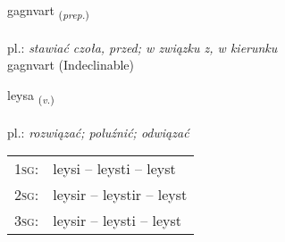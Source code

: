 \documentclass[frontgrid, backgrid]{flacards}\usepackage[]{graphicx}\usepackage[]{xcolor}
\begin{document}

\renewcommand{\flhead}{\vskip5pt \fboxsep=0pt {\small\bfseries\footnotesize Forsetning | przyimek}}
\renewcommand{\fcfoot}{\vskip5pt \fboxsep=0pt \hspace{2pt}{\small\bfseries\footnotesize 1K}}

\renewcommand{\blhead}{\vskip5pt {\small\bfseries\footnotesize Forsetning | przyimek }}
\renewcommand{\bcfoot}{\vskip5pt \hspace{2pt}{\small\bfseries\footnotesize 1K}}


{gagnvart \small{\textsubscript{(\textit{prep.})}} \\[1ex]
\textphonetic{[kakvar̥t]} \\
pl.: \emph{stawiać czoła, przed; w związku z, w kierunku} \\  [2ex]
gagnvart (Indeclinable)}

\renewcommand{\flhead}{\vskip5pt \fboxsep=0pt {\small\bfseries\footnotesize Sagnorð | czasownik}}
\renewcommand{\fcfoot}{\vskip5pt \fboxsep=0pt \hspace{2pt}{\small\bfseries\footnotesize 1K}}

\renewcommand{\blhead}{\vskip5pt {\small\bfseries\footnotesize Sagnorð | czasownik }}
\renewcommand{\bcfoot}{\vskip5pt \hspace{2pt}{\small\bfseries\footnotesize 1K}}


{leysa \small{\textsubscript{(\textit{v.})}} \\[1ex] %
\textphonetic{[leiːsa]} \\
pl.: \emph{rozwiązać; poluźnić; odwiązać} \\  [2ex]
\renewcommand*{\arraystretch}{0.8}
\begin{tabular}{p{1cm}l}
\textsc{1sg}: & leysi -- leysti -- leyst \\ 
\textsc{2sg}: & leysir -- leystir -- leyst \\ 
\textsc{3sg}: & leysir -- leysti -- leyst \\ 
\end{tabular}
}
\end{document}
